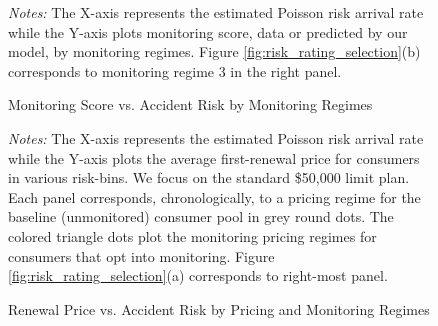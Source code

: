 \begin{figure}[H]
    \centering
    \caption{Monitoring Score vs. Accident Risk by Monitoring Regimes}
    \label{fig:score-vs-risk-by-regime}
\vspace{0.1cm}
\begin{minipage}{0.95\textwidth} %
    {\footnotesize \emph{Notes: }The X-axis represents the estimated Poisson risk arrival rate while the Y-axis plots monitoring score, data or predicted by our model, by monitoring regimes. Figure \ref{fig:risk_rating_selection}(b) corresponds to monitoring regime 3 in the right panel.\par}
\end{minipage}
\end{figure}

\begin{figure}[H]
    \centering
    \caption{Renewal Price vs. Accident Risk by Pricing and Monitoring Regimes}
    \label{fig:R-vs-risk-by-regime}
\vspace{0.1cm}
\begin{minipage}{0.95\textwidth} %
    {\footnotesize \emph{Notes: }The X-axis represents the estimated Poisson risk arrival rate while the Y-axis plots the average first-renewal price for consumers in various risk-bins. We focus on the standard \$50,000 limit plan.  Each panel corresponds, chronologically, to a pricing regime for the baseline (unmonitored) consumer pool in grey round dots. The colored triangle dots plot the monitoring pricing regimes for consumers that opt into monitoring. Figure \ref{fig:risk_rating_selection}(a) corresponds to right-most panel. \par}
\end{minipage}
\end{figure}
